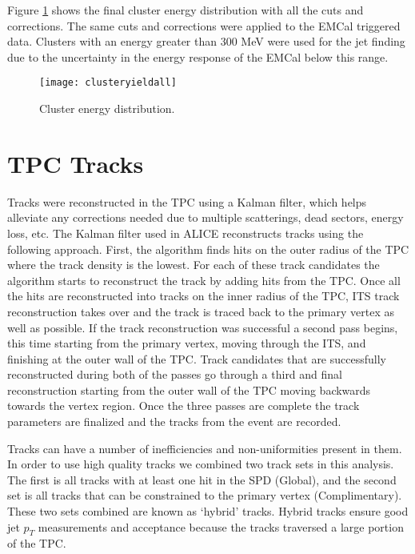 Figure \ref{fig:EMCalfinal} shows the final cluster energy distribution with all the cuts and corrections.  The same cuts and corrections were applied to the EMCal triggered data.  Clusters with an energy greater than 300 MeV were used for the jet finding due to the uncertainty in the energy response of the EMCal below this range.

\begin{figure}[t!]
\texttt{[image: clusteryieldall]}
\centering
\caption{Cluster energy distribution.}
\label{fig:EMCalfinal}
\end{figure}
\newpage

\section{TPC Tracks}

Tracks were reconstructed in the TPC using a Kalman filter, which helps alleviate any corrections needed due to multiple scatterings, dead sectors, energy loss, etc.  The Kalman filter used in ALICE reconstructs tracks using the following approach.  First, the algorithm finds hits on the outer radius of the TPC where the track density is the lowest.  For each of these track candidates the algorithm starts to reconstruct the track by adding hits from the TPC.   Once all the hits are reconstructed into tracks on the inner radius of the TPC, ITS track reconstruction takes over and the track is traced back to the primary vertex as well as possible.  If the track reconstruction was successful a second pass begins, this time starting from the primary vertex, moving through the ITS, and finishing at the outer wall of the TPC.  Track candidates that are successfully reconstructed during both of the passes go through a third and final reconstruction starting from the outer wall of the TPC moving backwards towards the vertex region.  Once the three passes are complete the track parameters are finalized and the tracks from the event are recorded. 

Tracks can have a number of inefficiencies and non-uniformities present in them.  In order to use high quality tracks we combined two track sets in this analysis.  The first is all tracks with at least one hit in the SPD (Global), and the second set is all tracks that can be constrained to the primary vertex (Complimentary).  These two sets combined are known as `hybrid' tracks.  Hybrid tracks ensure good jet $p_{T}$ measurements and acceptance because the tracks traversed a large portion of the TPC.  

